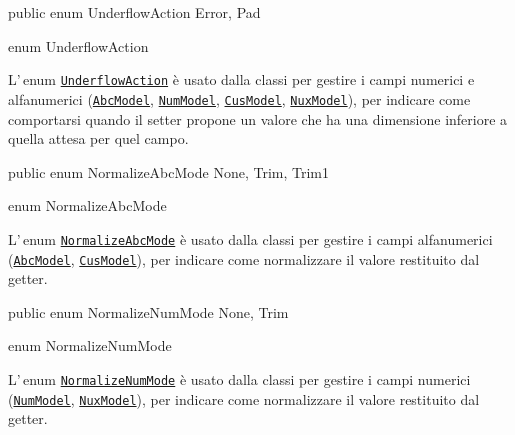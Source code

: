 \documentclass[a4paper,10pt]{report}
\newif\ifesource
\newenvironment{elisting}[1][H]
  {\captionsetup{aboveskip=0pt}\begin{listing}[#1]}
  {\end{listing}%
}
\begin{document}
\ifesource
\begin{lstlisting}[language=java, 
caption=enum UnderflowAction, 
label=lst:UnderflowAction]
public enum UnderflowAction { Error, Pad }
\end{lstlisting}\index{UnderflowAction}
\else
\begin{elisting}
\begin{javacode}
public enum UnderflowAction { Error, Pad }
\end{javacode}
\caption{enum UnderflowAction}\label{lst:UnderflowAction}
\end{elisting}
\fi
L'\,enum \hyperref[lst:UnderflowAction]{\texttt{UnderflowAction}} è usato dalla 
classi per gestire i campi numerici e alfanumerici 
(\hyperref[lst:AbcModel]{\texttt{AbcModel}},\break
\hyperref[lst:NumModel]{\texttt{NumModel}},
\hyperref[lst:CusModel]{\texttt{CusModel}},
\hyperref[lst:NuxModel]{\texttt{NuxModel}}), per indicare come comportarsi
quando il setter propone un valore che ha una dimensione inferiore a quella
attesa per quel campo.

\ifesource
\begin{lstlisting}[language=java, 
caption=enum NormalizeAbcMode, 
label=lst:NormalizeAbcMode]
public enum NormalizeAbcMode { None, Trim, Trim1 }
\end{lstlisting}\index{NormalizeAbcMode}
\else
\begin{elisting}
\begin{javacode}
public enum NormalizeAbcMode { None, Trim, Trim1 }
\end{javacode}
\caption{enum NormalizeAbcMode}\label{lst:NormalizeAbcMode}
\end{elisting}
\fi
L'\,enum \hyperref[lst:NormalizeAbcMode]{\texttt{NormalizeAbcMode}} è usato 
dalla classi per gestire i campi alfanumerici 
(\hyperref[lst:AbcModel]{\texttt{AbcModel}},
\hyperref[lst:CusModel]{\texttt{CusModel}}), per indicare come normalizzare
il valore restituito dal getter.

\ifesource
\begin{lstlisting}[language=java, 
caption=enum NormalizeNumMode, 
label=lst:NormalizeNumMode]
public enum NormalizeNumMode { None, Trim }
\end{lstlisting}\index{NormalizeNumMode}
\else
\begin{elisting}
\begin{javacode}
public enum NormalizeNumMode { None, Trim }
\end{javacode}
\caption{enum NormalizeNumMode}\label{lst:NormalizeNumMode}
\end{elisting}
\fi
L'\,enum \hyperref[lst:NormalizeNumMode]{\texttt{NormalizeNumMode}} è usato 
dalla classi per gestire i campi numerici 
(\hyperref[lst:NumModel]{\texttt{NumModel}},
\hyperref[lst:NuxModel]{\texttt{NuxModel}}), per indicare come normalizzare
il valore restituito dal getter.
\end{document}
